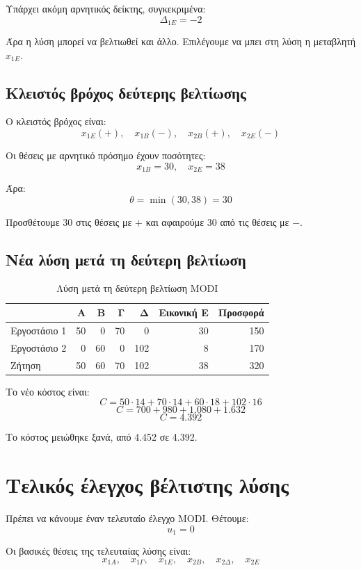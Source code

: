 \documentclass[12pt,a4paper]{article}
\begin{document}
Υπάρχει ακόμη αρνητικός δείκτης, συγκεκριμένα:
\[
\Delta_{1E}=-2
\]

Άρα η λύση μπορεί να βελτιωθεί και άλλο. Επιλέγουμε να μπει στη λύση η μεταβλητή \(x_{1E}\).

\subsection{Κλειστός βρόχος δεύτερης βελτίωσης}

Ο κλειστός βρόχος είναι:
\[
x_{1E}(+),\quad x_{1B}(-),\quad x_{2B}(+),\quad x_{2E}(-)
\]

Οι θέσεις με αρνητικό πρόσημο έχουν ποσότητες:
\[
x_{1B}=30,\quad x_{2E}=38
\]

Άρα:
\[
\theta=\min(30,38)=30
\]

Προσθέτουμε 30 στις θέσεις με \(+\) και αφαιρούμε 30 από τις θέσεις με \(-\).

\subsection{Νέα λύση μετά τη δεύτερη βελτίωση}

\begin{table}[H]
\centering
\caption{Λύση μετά τη δεύτερη βελτίωση MODI}
\small
\begin{tabular}{lrrrrrr}
\toprule
 & \textbf{Α} & \textbf{Β} & \textbf{Γ} & \textbf{Δ} & \textbf{Εικονική Ε} & \textbf{Προσφορά} \\
\midrule
Εργοστάσιο 1 & 50 & 0 & 70 & 0 & 30 & 150 \\
Εργοστάσιο 2 & 0 & 60 & 0 & 102 & 8 & 170 \\
\midrule
Ζήτηση & 50 & 60 & 70 & 102 & 38 & 320 \\
\bottomrule
\end{tabular}
\end{table}

Το νέο κόστος είναι:
\[
C=50\cdot14+70\cdot14+60\cdot18+102\cdot16
\]
\[
C=700+980+1.080+1.632
\]
\[
\boxed{C=4.392}
\]

Το κόστος μειώθηκε ξανά, από 4.452 σε 4.392.

\section{Τελικός έλεγχος βέλτιστης λύσης}

Πρέπει να κάνουμε έναν τελευταίο έλεγχο MODI. Θέτουμε:
\[
u_1=0
\]

Οι βασικές θέσεις της τελευταίας λύσης είναι:
\[
x_{1A},\quad x_{1\Gamma},\quad x_{1E},\quad x_{2B},\quad x_{2\Delta},\quad x_{2E}
\]
\end{document}
